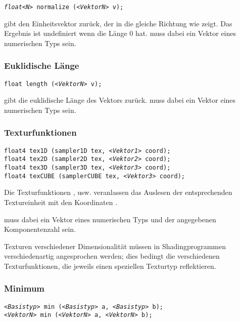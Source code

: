 \texttt{\emph{float<N>} normalize (\emph{<VektorN>} v);}

 gibt den Einheitsvektor zurück, der in die gleiche Richtung wie
 zeigt. Das Ergebnis ist undefiniert wenn  die Länge $0$ hat.
 muss dabei ein Vektor eines numerischen Typs sein.

\subsubsection{Euklidische Länge}

\texttt{float length (\emph{<VektorN>} v);}

 gibt die euklidische Länge des Vektors  zurück.
 muss dabei ein Vektor eines numerischen Typs sein.

\subsubsection{Texturfunktionen}
\label{Texturfunktionen}

\texttt{float4 tex1D (sampler1D tex, \emph{<Vektor1>} coord);}\\
\texttt{float4 tex2D (sampler2D tex, \emph{<Vektor2>} coord);}\\
\texttt{float4 tex3D (sampler3D tex, \emph{<Vektor3>} coord);}\\
\texttt{float4 texCUBE (samplerCUBE tex, \emph{<Vektor3>} coord);}

Die Texturfunktionen ,  usw. veranlassen das Auslesen der  entsprechenden
Textureinheit mit den Koordinaten .

 muss dabei ein Vektor eines numerischen Typs und der angegebenen
Komponentenzahl sein.

Texturen verschiedener
Dimensionalität müssen in Shadingprogrammen verschiedenartig angesprochen werden;
dies bedingt die verschiedenen Texturfunktionen, die jeweils einen speziellen Texturtyp
reflektieren.

\subsubsection{Minimum}

\texttt{\emph{<Basistyp>} min (\emph{<Basistyp>} a, \emph{<Basistyp>} b);}\\
\texttt{\emph{<VektorN>} min (\emph{<VektorN>} a, \emph{<VektorN>} b);}

